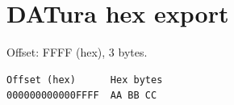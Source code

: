 \documentclass{article}
\begin{document}
\section*{DATura hex export}
Offset: FFFF (hex), 3 bytes.
\small
\begin{verbatim}
Offset (hex)      Hex bytes
000000000000FFFF  AA BB CC
\end{verbatim}
\end{document}
